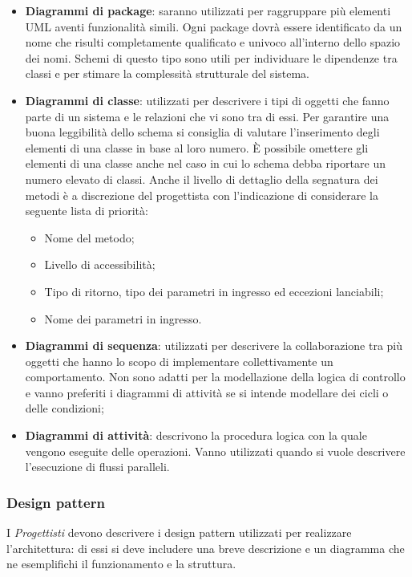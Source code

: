 		\begin{itemize}
		
		
		\item \textbf{Diagrammi di package}: saranno utilizzati per raggruppare più elementi UML aventi funzionalità simili. Ogni package dovrà essere identificato da un nome che risulti completamente qualificato e univoco all’interno dello spazio dei nomi. Schemi di questo tipo sono utili per individuare le dipendenze tra classi e per stimare la complessità strutturale del sistema.
		\item \textbf{Diagrammi di classe}: utilizzati per descrivere i tipi di oggetti che fanno parte di un sistema e le relazioni che vi sono tra di essi. Per garantire una buona leggibilità dello schema si consiglia di valutare l'inserimento degli elementi di una classe in base al loro numero. È possibile omettere gli elementi di una classe anche nel caso in cui lo schema debba riportare un numero elevato di classi. Anche il livello di dettaglio della segnatura dei metodi è a discrezione del progettista con l’indicazione di considerare la seguente lista di priorità:
		\begin{itemize}		
		\item Nome del metodo;
		\item Livello di accessibilità;
		\item Tipo di ritorno, tipo dei parametri in ingresso ed eccezioni lanciabili;
		\item Nome dei parametri in ingresso.
		\end{itemize}
		\item \textbf{Diagrammi di sequenza}: utilizzati per descrivere la collaborazione tra più oggetti che hanno lo scopo di implementare collettivamente un comportamento. Non sono adatti per la modellazione della logica di controllo e vanno preferiti i diagrammi di attività se si intende modellare dei cicli o delle condizioni;
		\item \textbf{Diagrammi di attività}: descrivono la procedura logica con la quale vengono eseguite delle operazioni. Vanno utilizzati quando si vuole descrivere	l’esecuzione di flussi paralleli.
        \end{itemize}
 
	\subsubsection{Design pattern}
	I \textit{Progettisti} devono descrivere i design pattern utilizzati per realizzare l'architettura:
	di essi si deve includere una breve descrizione e un diagramma che ne esemplifichi il funzionamento e la struttura.
